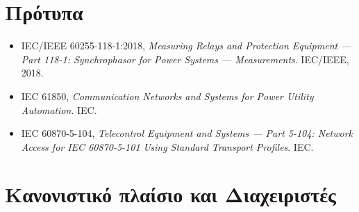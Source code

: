 \section*{Πρότυπα}

\begin{itemize}
\item IEC/IEEE 60255-118-1:2018, \textit{Measuring Relays and Protection Equipment ---
      Part 118-1: Synchrophasor for Power Systems --- Measurements}. IEC/IEEE, 2018.
\item IEC 61850, \textit{Communication Networks and Systems for Power Utility Automation}. IEC.
\item IEC 60870-5-104, \textit{Telecontrol Equipment and Systems --- Part 5-104: Network
      Access for IEC 60870-5-101 Using Standard Transport Profiles}. IEC.
\end{itemize}

\section*{Κανονιστικό πλαίσιο και Διαχειριστές}

